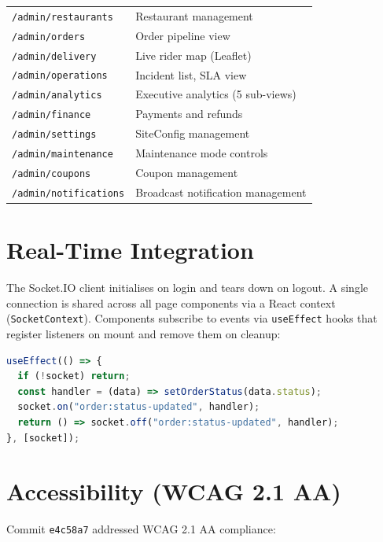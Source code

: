 \documentclass[11pt,a4paper,twoside]{book}
\begin{document}
\begin{center}
\begin{longtable}{p{5.5cm}p{7cm}}
\texttt{/admin/restaurants}         & Restaurant management \\
\rowcolor{rowalt}\texttt{/admin/orders}                & Order pipeline view \\
\texttt{/admin/delivery}            & Live rider map (Leaflet) \\
\rowcolor{rowalt}\texttt{/admin/operations}            & Incident list, SLA view \\
\texttt{/admin/analytics}           & Executive analytics (5 sub-views) \\
\rowcolor{rowalt}\texttt{/admin/finance}               & Payments and refunds \\
\texttt{/admin/settings}            & SiteConfig management \\
\rowcolor{rowalt}\texttt{/admin/maintenance}           & Maintenance mode controls \\
\texttt{/admin/coupons}             & Coupon management \\
\rowcolor{rowalt}\texttt{/admin/notifications}         & Broadcast notification management \\
\bottomrule
\end{longtable}
\end{center}

\section{Real-Time Integration}

The Socket.IO client initialises on login and tears down on logout.  A single
connection is shared across all page components via a React context
(\texttt{SocketContext}).  Components subscribe to events via \texttt{useEffect}
hooks that register listeners on mount and remove them on cleanup:

\begin{lstlisting}[language=JavaScript,caption={Socket listener pattern}]
useEffect(() => {
  if (!socket) return;
  const handler = (data) => setOrderStatus(data.status);
  socket.on("order:status-updated", handler);
  return () => socket.off("order:status-updated", handler);
}, [socket]);
\end{lstlisting}

\section{Accessibility (WCAG 2.1 AA)}

Commit \texttt{e4c58a7} addressed WCAG 2.1 AA compliance:
\end{document}
